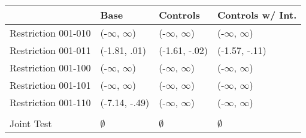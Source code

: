 \begin{tabular}{llll}
\toprule
{} &           Base &       Controls & Controls w/ Int. \\
\midrule
Restriction 001-010 &      (-$\infty$, $\infty$) &      (-$\infty$, $\infty$) &        (-$\infty$, $\infty$) \\
Restriction 001-011 &   (-1.81, .01) &  (-1.61, -.02) &    (-1.57, -.11) \\
Restriction 001-100 &      (-$\infty$, $\infty$) &      (-$\infty$, $\infty$) &        (-$\infty$, $\infty$) \\
Restriction 001-101 &      (-$\infty$, $\infty$) &      (-$\infty$, $\infty$) &        (-$\infty$, $\infty$) \\
Restriction 001-110 &  (-7.14, -.49) &      (-$\infty$, $\infty$) &        (-$\infty$, $\infty$) \\
\hline\\Joint Test  &         $\emptyset$ &         $\emptyset$ &           $\emptyset$ \\
\bottomrule
\end{tabular}
